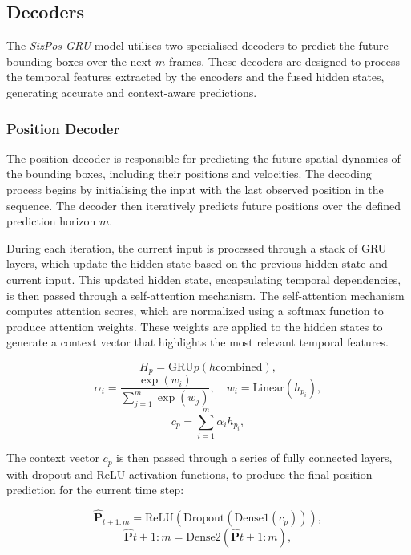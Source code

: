 \documentclass[12pt,oneside]{book} %
\begin{document}
\subsection{Decoders}
The \textit{SizPos-GRU} model utilises two specialised decoders to predict the
future bounding boxes over the next \(m\) frames. These decoders are designed
to process the temporal features extracted by the encoders and the fused hidden
states, generating accurate and context-aware predictions.

\subsubsection{Position Decoder}
The position decoder is responsible for predicting the future spatial dynamics
of the bounding boxes, including their positions and velocities. The decoding
process begins by initialising the input with the last observed position in the
sequence. The decoder then iteratively predicts future positions over the
defined prediction horizon \(m\).

During each iteration, the current input is processed through a stack of GRU
layers, which update the hidden state based on the previous hidden state and
current input. This updated hidden state, encapsulating temporal dependencies,
is then passed through a self-attention mechanism. The self-attention mechanism
computes attention scores, which are normalized using a softmax function to
produce attention weights. These weights are applied to the hidden states to
generate a context vector that highlights the most relevant temporal features.

\begin{equation}
    H_p = \text{GRU}p(h{\text{combined}}),
\end{equation}
\begin{equation}
    \alpha_i = \frac{\exp(w_i)}{\sum_{j=1}^{m}\exp(w_j)}, \quad w_i = \text{Linear}(h_{p_i}),
\end{equation}
\begin{equation}
    c_p = \sum_{i=1}^{m} \alpha_i h_{p_i},
\end{equation}

The context vector $c_p$ is then passed through a series of fully connected
layers, with dropout and ReLU activation functions, to produce the final
position prediction for the current time step:

\begin{equation}
    \hat{\mathbf{P}}_{t+1:m} = \text{ReLU}(\text{Dropout}(\text{Dense}1(c_p))),
\end{equation}
\begin{equation}
    \hat{\mathbf{P}}{t+1:m} = \text{Dense}2(\hat{\mathbf{P}}{t+1:m}),
\end{equation}
\end{document}
